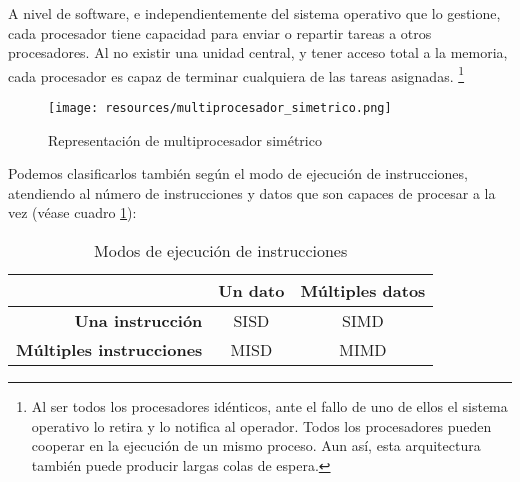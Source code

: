 \documentclass[a4paper, 11pt, titlepage]{article}
\begin{document}
\begin{itemize}
            A nivel de software, e independientemente del sistema operativo que lo gestione, 
            cada procesador tiene capacidad para enviar o repartir tareas a otros procesadores. 
            Al no existir una unidad central, y tener acceso total a la memoria, cada procesador 
            es capaz de terminar cualquiera de las tareas asignadas. \footnote{
                Al ser todos los procesadores idénticos, ante el fallo de uno de ellos el sistema 
                operativo lo retira y lo notifica al operador. Todos los procesadores pueden cooperar
                en la ejecución de un mismo proceso. Aun así, esta arquitectura también puede producir 
                largas colas de espera.
            }

            \begin{figure}[htp]
                \centering
                \texttt{[image: resources/multiprocesador\_simetrico.png]}
                \caption{Representación de multiprocesador simétrico}
                \label{multiprocesador_simetrico}
            \end{figure}
        \end{itemize}

        Podemos clasificarlos también según el modo de ejecución de instrucciones, atendiendo al 
        número de instrucciones y datos que son capaces de procesar a la vez (véase cuadro 
        \ref{modoejecucioninstrucciones}):

        \begin{table}[htp]
            \centering
            \caption{Modos de ejecución de instrucciones}
            \label{modoejecucioninstrucciones}
            \begin{tabular}{rcc}
                \hline
                & \textbf{Un dato} & \textbf{Múltiples datos} \\ \hline
                \textbf{Una instrucción} & SISD & SIMD \\ \hline
                \textbf{Múltiples instrucciones} & MISD & MIMD \\ \hline
            \end{tabular}
        \end{table}
\end{document}
